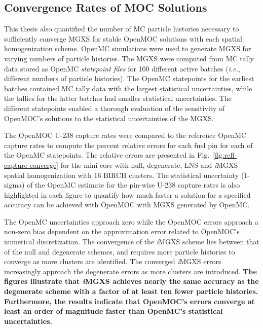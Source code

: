 \documentclass[12pt,twoside]{mitthesis-exec}
\begin{document}
\subsection*{Convergence Rates of MOC Solutions}

This thesis also quantified the number of MC particle histories necessary to sufficiently converge MGXS for stable OpenMOC solutions with each spatial homogenization scheme. OpenMC simulations were used to generate MGXS for varying numbers of particle histories. The MGXS were computed from MC tally data stored as OpenMC \textit{statepoint files} for 100 different active batches (\textit{i.e.}, different numbers of particle histories). The OpenMC statepoints for the earliest batches contained MC tally data with the largest statistical uncertainties, while the tallies for the latter batches had smaller statistical uncertainties. The different statepoints enabled a thorough evaluation of the sensitivity of OpenMOC's solutions to the statistical uncertainties of the MGXS.

The OpenMOC U-238 capture rates were compared to the reference OpenMC capture rates to compute the percent relative errors for each fuel pin for each of the OpenMC statepoints. The relative errors are presented in Fig.~\ref{fig:refl-capture-converge} for the mini core with null, degenerate, LNS and \textit{i}MGXS spatial homogenization with 16 BIRCH clusters. The statistical uncertainty (1-sigma) of the OpenMC estimate for the pin-wise U-238 capture rates is also highlighted in each figure to quantify how much faster a solution for a specified accuracy can be achieved with OpenMOC with MGXS generated by OpenMC.

The OpenMC uncertainties approach zero while the OpenMOC errors approach a non-zero bias dependent on the approximation error related to OpenMOC's numerical discretization. The convergence of the \textit{i}MGXS scheme lies between that of the null and degenerate schemes, and requires more particle histories to converge as more clusters are identified. The converged \textit{i}MGXS errors increasingly approach the degenerate errors as more clusters are introduced. \textbf{The figures illustrate that \textit{i}MGXS achieves nearly the same accuracy as the degenerate scheme with a factor of at least ten fewer particle histories. Furthermore, the results indicate that OpenMOC's errors converge at least an order of magnitude faster than OpenMC's statistical uncertainties.}
 
\end{document}
